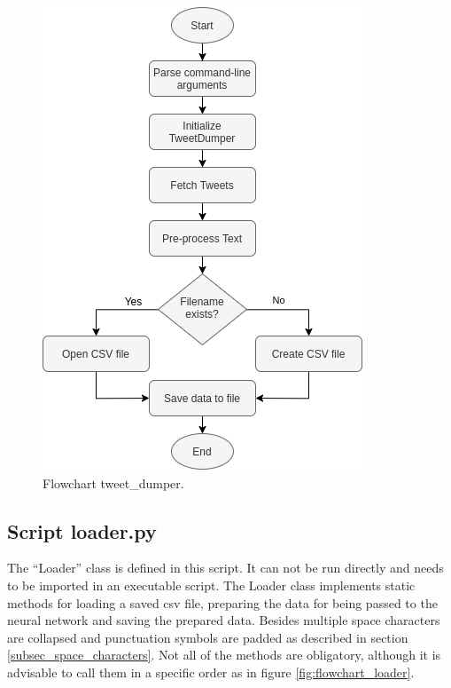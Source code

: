 \documentclass[conference]{IEEEtran}
\begin{document}
\begin{figure}[htbp]
\centerline{\includegraphics[scale=0.65]{pictures/flowchart_tweet_dumper.png}}
\caption{Flowchart tweet\_dumper.}
\label{fig:flowchart_tweet_dumper}
\end{figure}

\subsection{Script loader.py}\label{subsec_loader}

The ``Loader'' class is defined in this script. It can not be run directly and needs to be imported in an executable script. The Loader class implements static methods for loading a saved csv file, preparing the data for being passed to the neural network and saving the prepared data. Besides multiple space characters are collapsed and punctuation symbols are padded as described in section \ref{subsec_space_characters}. Not all of the methods are obligatory, although it is advisable to call them in a specific order as in figure \ref{fig:flowchart_loader}. 
\end{document}
